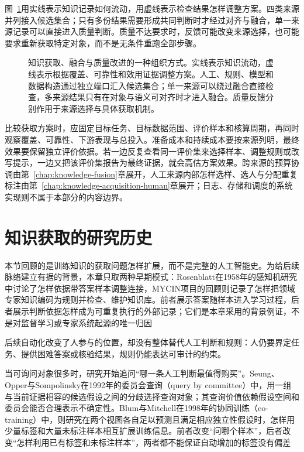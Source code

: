 图~\ref{fig:knowledge-acquisition-workflow}用实线表示知识记录如何流动，用虚线表示检查结果怎样调整方案。四类来源并列接入候选集合；只有多份结果需要形成共同判断时才经过对齐与融合，单一来源记录可以直接进入质量判断。质量不达要求时，反馈可能改变来源选择，也可能要求重新获取特定对象，而不是无条件重跑全部步骤。

\begin{figure}[htbp]
  \centering
  
  \caption{知识获取、融合与质量改进的一种组织方式。实线表示知识流动，虚线表示根据覆盖、可靠性和效用证据调整方案。人工、规则、模型和数据构造通过独立端口汇入候选集合；单一来源可以绕过融合直接检查，多来源结果只有在对象与语义可对齐时才进入融合。质量反馈分别作用于来源选择与具体获取机制。}
  \label{fig:knowledge-acquisition-workflow}
\end{figure}

比较获取方案时，应固定目标任务、目标数据范围、评价样本和核算周期，再同时观察覆盖、可靠性、下游表现与总投入。准备成本和持续成本要按来源列明，最终效果要保留独立评价依据。若一边反复查看同一评价集来选择样本、调整规则或改写提示，一边又把该评价集报告为最终证据，就会高估方案效果。跨来源的预算协调由第~\ref{chap:knowledge-fusion}章展开，人工来源内部怎样选样、选人与分配重复标注由第~\ref{chap:knowledge-acquisition-human}章展开；日志、存储和调度的系统实现则不属于本部分的内容边界。

\section{知识获取的研究历史}
\label{sec:knowledge-acquisition-history}

本节回顾的是训练知识的获取问题怎样扩展，而不是完整的人工智能史。为给后续脉络建立有据的背景，本章只取两种早期模式：Rosenblatt在1958年的感知机研究中讨论了怎样依据带答案样本调整连接，MYCIN项目的回顾则记录了怎样把领域专家知识编码为规则并检查、维护知识库。前者展示答案随样本进入学习过程，后者展示判断依据怎样成为可重复执行的外部记录；它们是本章采用的背景例证，不是对监督学习或专家系统起源的唯一归因

后续自动化改变了人参与的位置，却没有整体替代人工判断和规则：人仍要界定任务、提供困难答案或核验结果，规则仍能表达可审计的约束。

当可询问对象很多时，研究开始追问“哪一条人工判断最值得购买”。Seung、Opper与Sompolinsky在1992年的委员会查询（query by committee）中，用一组与当前证据相容的候选假设之间的分歧选择查询对象；其查询价值依赖假设空间和委员会能否合理表示不确定性。Blum与Mitchell在1998年的协同训练（co-training）中，则研究在两个视图各自足以预测且满足相应独立性假设时，怎样用少量标签和大量未标注样本相互扩展训练信息。前者改变“问哪个样本”，后者改变“怎样利用已有标签和未标注样本”，两者都不能保证自动增加的标签没有偏差

